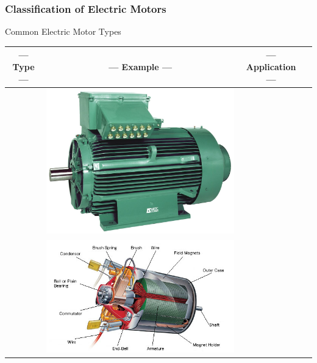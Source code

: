 \documentclass[fleqn]{beamer} %
\newcommand{\sectiontitleI}{Classification of Electric Motors}
\begin{document}
	\begin{frame}[label=sectionI] \small
		\frametitle{\sectiontitleI}	
		
		Common Electric Motor Types

		\begin{tabular}{|c|c|c|c|} 
			--- Type --- & --- Example --- & --- Application --- \\ \hline  
			& \includegraphics[scale=.05]{images/Ac-elektromotor-robuster-asynchronmotor.jpeg} & \\ \hline                  %
			& \includegraphics[scale=.29]{images/brushed_dcmotor.jpg} & \\ \hline                  %
 
		\end{tabular}

	\end{frame}
\end{document}
